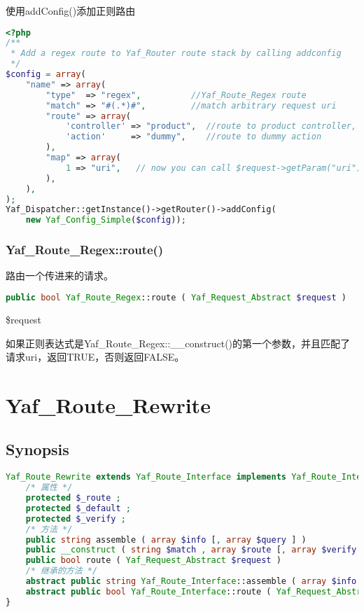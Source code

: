 \begin{example}
使用addConfig()添加正则路由
\begin{lstlisting}[language=PHP]
<?php
/**
 * Add a regex route to Yaf_Router route stack by calling addconfig
 */
$config = array(
    "name" => array(
        "type"  => "regex",          //Yaf_Route_Regex route
        "match" => "#(.*)#",         //match arbitrary request uri
        "route" => array(
            'controller' => "product",  //route to product controller,
            'action'     => "dummy",    //route to dummy action
        ),
        "map" => array(
            1 => "uri",   // now you can call $request->getParam("uri")
        ),
    ),
);
Yaf_Dispatcher::getInstance()->getRouter()->addConfig(
    new Yaf_Config_Simple($config));
\end{lstlisting}
\end{example}

\subsection{Yaf\_Route\_Regex::route()}

路由一个传进来的请求。


\begin{lstlisting}[language=PHP]
public bool Yaf_Route_Regex::route ( Yaf_Request_Abstract $request )
\end{lstlisting}

\begin{compactitem}
\item \$request
\end{compactitem}

如果正则表达式是Yaf\_Route\_Regex::\_\_construct()的第一个参数，并且匹配了请求uri，返回TRUE，否则返回FALSE。


\chapter{Yaf\_Route\_Rewrite}

\section{Synopsis}


\begin{lstlisting}[language=PHP]
Yaf_Route_Rewrite extends Yaf_Route_Interface implements Yaf_Route_Interface {
    /* 属性 */
    protected $_route ;
    protected $_default ;
    protected $_verify ;
    /* 方法 */
    public string assemble ( array $info [, array $query ] )
    public __construct ( string $match , array $route [, array $verify ] )
    public bool route ( Yaf_Request_Abstract $request )
    /* 继承的方法 */
    abstract public string Yaf_Route_Interface::assemble ( array $info [, array $query ] )
    abstract public bool Yaf_Route_Interface::route ( Yaf_Request_Abstract $request )
}
\end{lstlisting}


